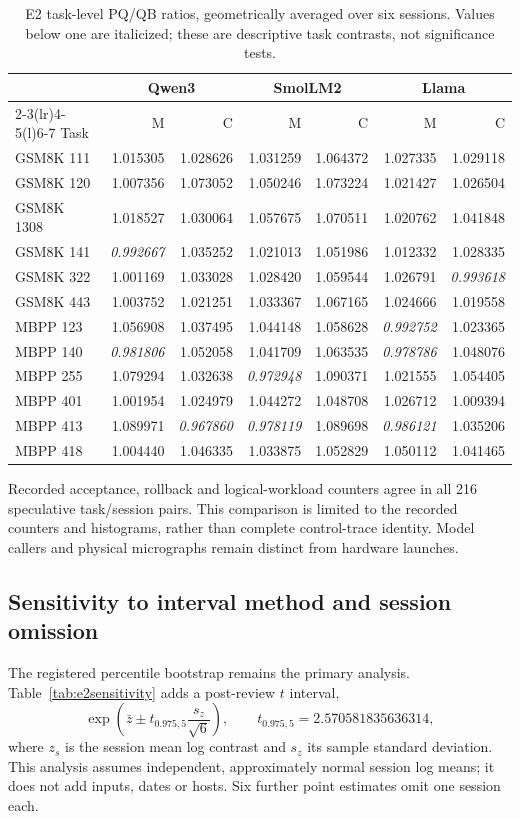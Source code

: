 \begin{table}[t]\centering\small
\caption{E2 task-level PQ/QB ratios, geometrically averaged over six sessions. Values below one are italicized; these are descriptive task contrasts, not significance tests.}\label{tab:e2tasks}
\begin{tabular}{lrrrrrr}\toprule
&\multicolumn{2}{c}{Qwen3}&\multicolumn{2}{c}{SmolLM2}&\multicolumn{2}{c}{Llama}\\
\cmidrule(lr){2-3}\cmidrule(lr){4-5}\cmidrule(l){6-7}
Task & M & C & M & C & M & C\\\midrule
GSM8K 111&1.015305&1.028626&1.031259&1.064372&1.027335&1.029118\\
GSM8K 120&1.007356&1.073052&1.050246&1.073224&1.021427&1.026504\\
GSM8K 1308&1.018527&1.030064&1.057675&1.070511&1.020762&1.041848\\
GSM8K 141&\textit{0.992667}&1.035252&1.021013&1.051986&1.012332&1.028335\\
GSM8K 322&1.001169&1.033028&1.028420&1.059544&1.026791&\textit{0.993618}\\
GSM8K 443&1.003752&1.021251&1.033367&1.067165&1.024666&1.019558\\
MBPP 123&1.056908&1.037495&1.044148&1.058628&\textit{0.992752}&1.023365\\
MBPP 140&\textit{0.981806}&1.052058&1.041709&1.063535&\textit{0.978786}&1.048076\\
MBPP 255&1.079294&1.032638&\textit{0.972948}&1.090371&1.021555&1.054405\\
MBPP 401&1.001954&1.024979&1.044272&1.048708&1.026712&1.009394\\
MBPP 413&1.089971&\textit{0.967860}&\textit{0.978119}&1.089698&\textit{0.986121}&1.035206\\
MBPP 418&1.004440&1.046335&1.033875&1.052829&1.050112&1.041465\\
\bottomrule\end{tabular}\end{table}

Recorded acceptance, rollback and logical-workload counters agree in all 216 speculative task/session pairs. This comparison is limited to the recorded counters and histograms, rather than complete control-trace identity. Model callers and physical micrographs remain distinct from hardware launches.

\subsection{Sensitivity to interval method and session omission}
The registered percentile bootstrap remains the primary analysis. Table~\ref{tab:e2sensitivity} adds a post-review $t$ interval,
\[
\exp\!\left(\bar z\pm t_{0.975,5}\frac{s_z}{\sqrt6}\right),
\qquad t_{0.975,5}=2.570581835636314,
\]
where $z_s$ is the session mean log contrast and $s_z$ its sample standard deviation. This analysis assumes independent, approximately normal session log means; it does not add inputs, dates or hosts. Six further point estimates omit one session each.

